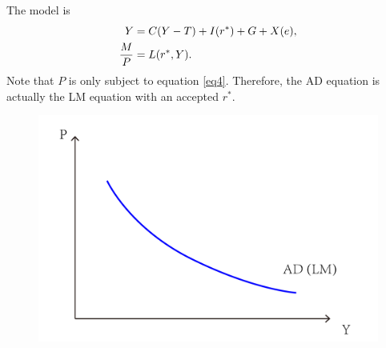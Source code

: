 \documentclass{article}
\begin{document}
\section{}
\subsection{}
The model is
\begin{align}
    Y &= C(Y - T) + I(r^\ast) + G + X(e),\notag \\
    \frac{M}{P} &= L(r^\ast, Y).\label{eq4}
\end{align}
Note that $P$ is only subject to equation \eqref{eq4}. Therefore, the AD equation is actually the LM equation with an accepted $r^\ast$.
\begin{figure}[h]
    \centering
    \includegraphics[scale=0.15]{figure/3-1.pdf}
\end{figure}
\end{document}
